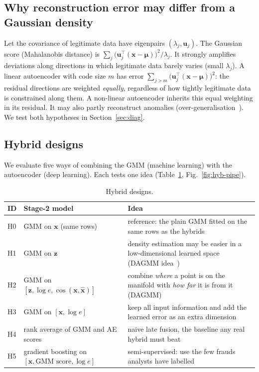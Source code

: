 \documentclass[12pt]{article}
\begin{document}
\subsection{Why reconstruction error may differ from a Gaussian density}
Let the covariance of legitimate data have eigenpairs $(\lambda_j,\mathbf{u}_j)$. The Gaussian score (Mahalanobis
distance) is $\sum_j\big(\mathbf{u}_j^{\top}(\mathbf{x}-\bm\mu)\big)^2/\lambda_j$. It strongly amplifies deviations along
directions in which legitimate data barely varies (small $\lambda_j$). A linear autoencoder with code size $m$ has
error $\sum_{j>m}\big(\mathbf{u}_j^{\top}(\mathbf{x}-\bm\mu)\big)^2$: the residual directions are weighted
\emph{equally}, regardless of how tightly legitimate data is constrained along them. A non-linear autoencoder inherits
this equal weighting in its residual. It may also partly reconstruct anomalies (over-generalisation~\cite{pang2021}).
We test both hypotheses in Section~\ref{sec:diag}.

\subsection{Hybrid designs}\label{sec:hyb}
We evaluate five ways of combining the GMM (machine learning) with the autoencoder (deep learning). Each tests one idea
(Table~\ref{tab:hyb-design}, Fig.~\ref{fig:hyb-pipe}).

\begin{table}[H]
\centering\small
\caption{Hybrid designs.}
\label{tab:hyb-design}
\begin{tabularx}{\linewidth}{@{}l l X@{}}
\toprule
\textbf{ID} & \textbf{Stage-2 model} & \textbf{Idea}\\
\midrule
H0 & GMM on $\mathbf{x}$ (same rows) & reference: the plain GMM fitted on the same rows as the hybrids\\
H1 & GMM on $\mathbf{z}$ & density estimation may be easier in a low-dimensional learned space (DAGMM idea~\cite{zong2018})\\
H2 & GMM on $[\mathbf{z},\log e,\cos(\mathbf{x},\hat{\mathbf{x}})]$ & combine \emph{where} a point is on the manifold with \emph{how far} it is from it (DAGMM)\\
H3 & GMM on $[\mathbf{x},\log e]$ & keep all input information and add the learned error as an extra dimension\\
H4 & rank average of GMM and AE scores & naive late fusion, the baseline any real hybrid must beat\\
H5 & gradient boosting on $[\mathbf{x},\text{GMM score},\log e]$ & semi-supervised: use the few frauds analysts have labelled~\cite{carcillo2021}\\
\bottomrule
\end{tabularx}
\end{table}
\end{document}
